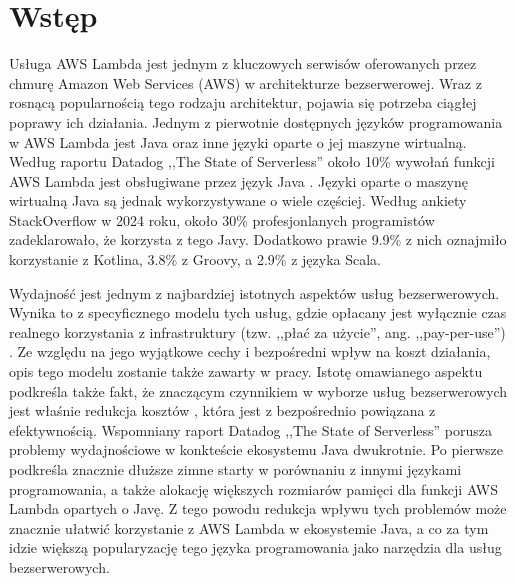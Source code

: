 \chapter*{Wstęp}\label{chapter:wstep}

Usługa AWS Lambda jest jednym z kluczowych serwisów oferowanych przez chmurę Amazon Web Services (AWS) w architekturze bezserwerowej. 
Wraz z rosnącą popularnością tego rodzaju architektur, pojawia się potrzeba ciągłej poprawy ich działania. 
Jednym z pierwotnie dostępnych języków programowania w AWS Lambda jest Java oraz inne języki oparte o jej maszyne wirtualną.
Według raportu Datadog ,,The State of Serverless'' około 10\% wywołań funkcji AWS Lambda jest obsługiwane przez język Java \cite{datadog_state_of_serverless}.
Języki oparte o maszynę wirtualną Java są jednak wykorzystywane o wiele częściej.
Według ankiety StackOverflow w 2024 roku, około 30\% profesjonlanych programistów zadeklarowało, że korzysta z tego Javy.
Dodatkowo prawie 9.9\% z nich oznajmiło korzystanie z Kotlina, 3.8\% z Groovy, a 2.9\% z języka Scala. 

Wydajność jest jednym z najbardziej istotnych aspektów usług bezserwerowych.
Wynika to z specyficznego modelu tych usług, gdzie opłacany jest wyłącznie czas realnego korzystania z infrastruktury (tzw. ,,płać za użycie'', ang. ,,pay-per-use'') \cite{ServerlessApplicationsWhyWhenAndHow}.
Ze względu na jego wyjątkowe cechy i bezpośredni wpływ na koszt działania, opis tego modelu zostanie także zawarty w pracy.
Istotę omawianego aspektu podkreśla także fakt, że znaczącym czynnikiem w wyborze usług bezserwerowych jest właśnie redukcja kosztów \cite{ServerlessApplicationsWhyWhenAndHow}, która jest z bezpośrednio powiązana z efektywnością.
Wspomniany raport Datadog ,,The State of Serverless'' \cite{datadog_state_of_serverless} porusza problemy wydajnościowe w konkteście ekosystemu Java dwukrotnie.
Po pierwsze podkreśla znacznie dłuższe zimne starty w porównaniu z innymi językami programowania, a także alokację większych rozmiarów pamięci dla funkcji AWS Lambda opartych o Javę.
Z tego powodu redukcja wpływu tych problemów może znacznie ułatwić korzystanie z AWS Lambda w ekosystemie Java, a co za tym idzie większą popularyzację tego języka programowania jako narzędzia dla usług bezserwerowych.

